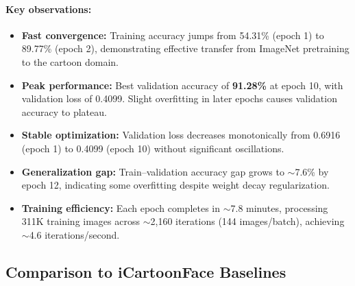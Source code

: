 \documentclass[11pt]{article}
\begin{document}
\paragraph{Key observations:}
\begin{itemize}
    \item \textbf{Fast convergence:} Training accuracy jumps from 54.31\% (epoch 1) to 89.77\% (epoch 2), demonstrating effective transfer from ImageNet pretraining to the cartoon domain.

    \item \textbf{Peak performance:} Best validation accuracy of \textbf{91.28\%} at epoch 10, with validation loss of 0.4099. Slight overfitting in later epochs causes validation accuracy to plateau.

    \item \textbf{Stable optimization:} Validation loss decreases monotonically from 0.6916 (epoch 1) to 0.4099 (epoch 10) without significant oscillations.

    \item \textbf{Generalization gap:} Train--validation accuracy gap grows to $\sim$7.6\% by epoch 12, indicating some overfitting despite weight decay regularization.

    \item \textbf{Training efficiency:} Each epoch completes in $\sim$7.8 minutes, processing 311K training images across $\sim$2,160 iterations (144 images/batch), achieving $\sim$4.6 iterations/second.
\end{itemize}

\subsection{Comparison to iCartoonFace Baselines}
\end{document}
